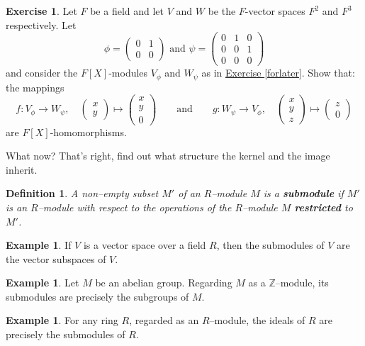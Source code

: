 \documentclass[11pt]{amsbook}
\newtheorem{definition}[theorem]{Definition}
\theoremstyle{definition}
\newtheorem{ex}[theorem]{Example}
\newtheorem{exercise}{Exercise}
\begin{document}
\begin{exercise} \label{easyexforme}
Let $F$ be a field and let $V$ and $W$ be the $F$-vector spaces $F^2$ and $F^3$ respectively. Let $$\phi = \begin{pmatrix} 0 & 1 \\ 0 & 0\end{pmatrix} \text{ and } \psi =  \begin{pmatrix} 0 & 1 & 0 \\ 0 & 0 & 1 \\ 0 & 0 & 0 \end{pmatrix} $$ and consider the $F[X]$-modules $V_{\phi}$ and $W_{\psi}$ as in \hyperref[forlater]{Exercise \ref{forlater}}. Show that: the mappings $$f: V_\phi \to W_{\psi}, \quad \begin{pmatrix} x \\ y \end{pmatrix} \mapsto  \begin{pmatrix} x \\ y \\ 0 \end{pmatrix} \qquad \text{and} \qquad g: W_\psi \to V_{\phi}, \quad \begin{pmatrix} x \\ y \\ z \end{pmatrix} \mapsto  \begin{pmatrix} z\\ 0 \end{pmatrix} $$ are $F[X]$-homomorphisms.
\end{exercise}

What now? That's right, find out what structure the kernel and the image inherit.

\begin{definition}
A non--empty subset $M'$ of an $R$--module $M$ is a {\bf
submodule} if $M'$ is an $R$--module with respect to the operations
of the $R$--module $M$ {\bf restricted} to $M'$.
\end{definition}

\begin{ex}
 If $V$ is a vector space over a field $R$, then the
submodules of $V$ are the vector subspaces of $V$.
\end{ex}
\begin{ex}
Let $M$ be
an abelian group. Regarding $M$ as a $\mathbb{Z}$--module, its submodules
are precisely the subgroups of $M$.
\end{ex}
\begin{ex}
 For any ring $R$,
regarded as an $R$--module, the ideals of $R$ 
are precisely the submodules of $R$. 
\end{ex}
\end{document}
